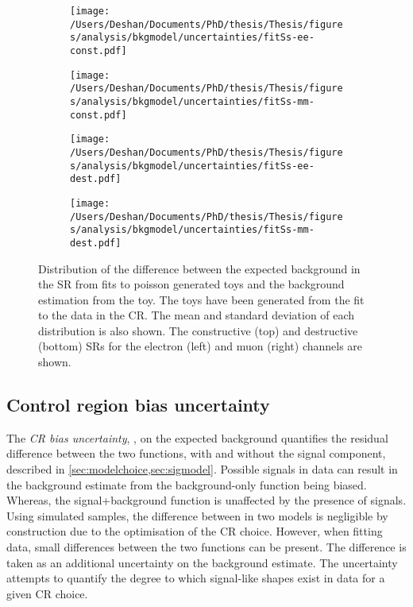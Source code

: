 \begin{figure}[h!]
    \centering
    \begin{subfigure}[b]{0.49\textwidth}
        \centering
        \texttt{[image: /Users/Deshan/Documents/PhD/thesis/Thesis/figures/analysis/bkgmodel/uncertainties/fitSs-ee-const.pdf]}
        \label{fig:bkgmodel:toyss1}
    \end{subfigure}
    \begin{subfigure}[b]{0.49\textwidth}
        \centering
        \texttt{[image: /Users/Deshan/Documents/PhD/thesis/Thesis/figures/analysis/bkgmodel/uncertainties/fitSs-mm-const.pdf]}
        \label{fig:bkgmodel:toyss2}
    \end{subfigure}
    \begin{subfigure}[b]{0.49\textwidth}
        \centering
        \texttt{[image: /Users/Deshan/Documents/PhD/thesis/Thesis/figures/analysis/bkgmodel/uncertainties/fitSs-ee-dest.pdf]}
        \label{fig:bkgmodel:toyss3}
    \end{subfigure}
    \begin{subfigure}[b]{0.49\textwidth}
        \centering
        \texttt{[image: /Users/Deshan/Documents/PhD/thesis/Thesis/figures/analysis/bkgmodel/uncertainties/fitSs-mm-dest.pdf]}
        \label{fig:bkgmodel:toyss4}
    \end{subfigure}
    \caption[Distributions of extrapolation from fit to poisson distributed toys generated in the CR]{Distribution of the difference between the expected background in the SR from fits to poisson generated toys and the background estimation from the toy. The toys have been generated from the fit to the data in the CR. The mean and standard deviation of each distribution is also shown. The constructive (top) and destructive (bottom) SRs for the electron (left) and muon (right) channels are shown.}
    \label{fig:bkgmodel:toyss}
\end{figure}

\subsection{Control region bias uncertainty}\label{sec:uncertBkgmodel:crbu}
The \emph{CR bias uncertainty}, \CRBU, on the expected background quantifies the residual difference between the two functions, with and without the signal component, described in \cref{sec:modelchoice,sec:sigmodel}. Possible signals in data can result in the background estimate from the background-only function being biased. Whereas, the signal+background function is unaffected by the presence of signals. Using simulated samples, the difference between in two models is negligible by construction due to the optimisation of the CR choice. However, when fitting data, small differences between the two functions can be present. The difference is taken as an additional uncertainty on the background estimate. The uncertainty attempts to quantify the degree to which signal-like shapes exist in data for a given CR choice. 

